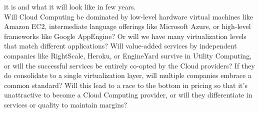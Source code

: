 it is and what it will look like in few years.\\
Will Cloud Computing be dominated by low-level hardware virtual machines like Amazon EC2, intermediate language offerings 
like Microsoft Azure, or high-level frameworks like Google AppEngine? Or will we have many virtualization levels that 
match different applications? Will value-added services by independent companies like RightScale, Heroku, or EngineYard 
survive in Utility Computing, or will the successful services be entirely co-opted by the Cloud providers? If they do 
consolidate to a single virtualization layer, will multiple companies embrace a common standard? Will this lead to a 
race to the bottom in pricing so that it’s unattractive to become a Cloud Computing provider, or will they differentiate 
in services or quality to maintain margins?
